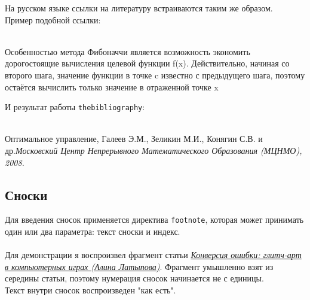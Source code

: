 \documentclass[a4paper]{article}
\newcommand{\cbox}[2][green]{%
  \colorbox{#1}{\parbox{\dimexpr\linewidth-2\fboxsep}{#2}}%
}
\begin{document}
На русском языке ссылки на литературу встраиваются таким же образом.\\
Пример подобной ссылки:\\\\
\cbox[lightgray!20]{Особенностью метода Фибоначчи является возможность экономить
	дорогостоящие вычисления целевой функции f(x). Действительно, начиная со
	второго шага, значение функции в точке c известно с предыдущего шага, поэтому
	остаётся вычислить только значение в отраженной точке x\cite{Opt}}
\hfill\break
И результат работы \lstinline{thebibliography}:\\\\
\cbox[lightgray!20]{
	\begin{thebibliography}{5}
		Оптимальное управление, Галеев Э.М., Зеликин М.И., Конягин С.В. и др.\emph{Московский Центр Непрерывного Математического Образования
		(МЦНМО), 2008.}
	\end{thebibliography}
}
\thispagestyle{empty}
\newpage
\subsection{Сноски}
Для введения сносок применяется директива \lstinline{footnote}, которая может принимать один или два параметра: текст сноски и индекс.\\\\
Для демонстрации я воспроизвел фрагмент статьи \emph{\href{https://artguide.com/posts/1251}{Конверсия ошибки: глитч-арт в компьютерных играх (Алина Латыпова)}}. Фрагмент умышленно взят из середины статьи, поэтому нумерация сносок начинается не с единицы. \\Текст внутри сносок воспроизведен "как есть".\\
\end{document}
